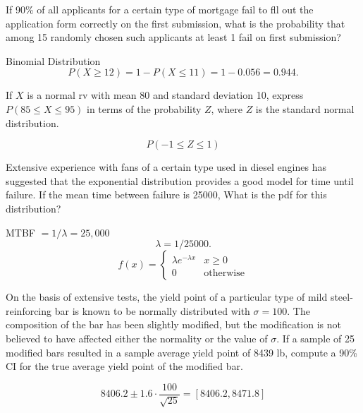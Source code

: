 \begin{questions}
    \question[2] If 90\% of all applicants for a certain type of
    mortgage fail to fll out the application form correctly on the
    first submission, what is the probability that among 15 randomly
    chosen such applicants at least 1 fail on first submission?
    \begin{solution} Binomial Distribution \\
        $$P(X \ge 12) = 1 - P(X \le 11) = 1 - 0.056 = 0.944.$$
    \end{solution}

    
    \question[2] If $X$ is a normal rv with mean 80 and standard
    deviation 10, express $P(85 \le X \le 95)$ in terms of the
    probability $Z$, where $Z$ is the standard normal distribution.
    \begin{solution}
        $$P(-1 \le Z \le 1)$$
    \end{solution}


    \question[2] Extensive experience with fans of a certain type used
    in diesel engines has suggested that the exponential distribution
    provides a good model for time until failure. If the mean time
    between failure is 25000, What is the pdf for
    this distribution?  
    \begin{solution}
        MTBF $= 1/\lambda = 25,000$
        $$\lambda = 1/25000.$$ 
        $$f(x) = \left\{ \begin{array}{ll}
                \lambda e^{-\lambda x} & x \ge 0 \\
                0          & \mbox{otherwise}
                \end{array} \right.$$
    \end{solution}

    
    \question[2] On the basis of extensive tests, the yield point of a
    particular type of mild steel-reinforcing bar is known to be
    normally distributed with $\sigma = 100$. The composition of the
    bar has been slightly modified, but the modification is not
    believed to have affected either the normality or the value of
    $\sigma$. If a sample of 25 modified bars resulted in a sample
    average yield point of 8439 lb, compute a 90\% CI for the true
    average yield point of the modified bar.

    \begin{solution}
        $$8406.2 \pm 1.6 \cdot \frac{100}{\sqrt{25}} = [8406.2,
        8471.8]$$
    \end{solution}


\end{questions}
